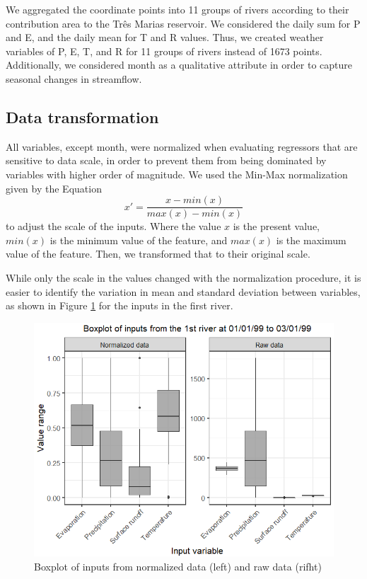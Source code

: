 \documentclass[12pt]{article}
\begin{document}
We aggregated the coordinate points into 11 groups of rivers according to their contribution area to the Três Marias reservoir. We considered the daily sum for P and E, and the daily mean for T and R values. Thus, we created weather variables of P, E, T, and R for 11 groups of rivers instead of 1673 points. Additionally, we considered month as a qualitative attribute in order to capture seasonal changes in streamflow.

\subsection{Data transformation}
\label{sec:DataTransformation}

All variables, except month, were normalized when evaluating regressors that are sensitive to data scale, in order to prevent them from being dominated by variables with higher order of magnitude. We used the Min-Max normalization given by the Equation
    \begin{equation}
    \label{eqn:Normalization}
    x' = \frac{x-min(x)}{max(x)-min(x)}
    \end{equation}
to adjust the scale of the inputs. Where the value $x$ is the present value, $min(x)$ is the minimum value of the feature, and $max(x)$ is the maximum value of the feature. Then, we transformed that to their original scale.

While only the scale in the values changed with the normalization procedure, it is easier to identify the variation in mean and standard deviation between variables, as shown in Figure \ref{fig:Normalized} for the inputs in the first river.

\begin{figure}[htb]
  \centering
  \includegraphics[width=0.8\linewidth, trim=0cm 0 0 .7cm,clip=true]{Figures/Normalização.png}
  \caption{Boxplot of inputs from normalized data (left) and raw data (rifht)}
  \label{fig:Normalized}
\end{figure}
\end{document}
